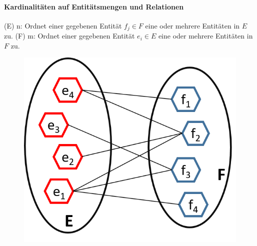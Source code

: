 \begin{frame}{\insertsection}
\framesubtitle{Kardinalitäten auf Entit\"atsmengen und Relationen}
\newline 
(E) n: Ordnet einer gegebenen Entit\"at $f_j \in F$ eine oder mehrere Entit\"aten in $E$ zu. 
\newline 
(F) m: Ordnet einer gegebenen Entit\"at $e_i \in E$ eine oder mehrere Entit\"aten in $F$ zu. 
\begin{figure}
	\includegraphics[scale=0.5]{img/ERM-1n-1m-Relation.png}
\end{figure}
\end{frame}

